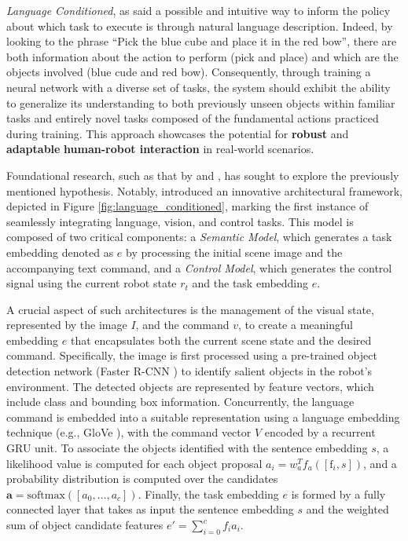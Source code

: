 \textit{Language Conditioned}, as said a possible and intuitive way to inform the policy about which task to execute is through natural language description. Indeed, by looking to the phrase ``Pick the blue cube and place it in the red bow'', there are both information about the action to perform (pick and place) and which are the objects involved (blue cude and red bow). Consequently, through training a neural network with a diverse set of tasks, the system should exhibit the ability to generalize its understanding to both previously unseen objects within familiar tasks and entirely novel tasks composed of the fundamental actions practiced during training. This approach showcases the potential for \textbf{robust} and \textbf{adaptable} \textbf{human-robot interaction} in real-world scenarios.

Foundational research, such as that by \cite{stepputtis2020language} and \cite{jang2022bc_z}, has sought to explore the previously mentioned hypothesis. Notably, \cite{stepputtis2020language} introduced an innovative architectural framework, depicted in Figure \ref{fig:language_conditioned}, marking the first instance of seamlessly integrating language, vision, and control tasks. This model is composed of two critical components: a \textit{Semantic Model}, which generates a task embedding denoted as $e$ by processing the initial scene image and the accompanying text command, and a \textit{Control Model}, which generates the control signal using the current robot state $r_{t}$ and the task embedding $e$.

A crucial aspect of such architectures is the management of the visual state, represented by the image $I$, and the command $v$, to create a meaningful embedding $e$ that encapsulates both the current scene state and the desired command. Specifically, the image is first processed using a pre-trained object detection network (Faster R-CNN \cite{fastrcnn}) to identify salient objects in the robot's environment. The detected objects are represented by feature vectors, which include class and bounding box information. Concurrently, the language command is embedded into a suitable representation using a language embedding technique (e.g., GloVe \cite{pennington2014glove}), with the command vector $V$ encoded by a recurrent GRU unit. To associate the objects identified with the sentence embedding $s$, a likelihood value is computed for each object proposal $a_{i} = w_{a}^{T} f_{a}([\text{f}_{i}, s])$, and a probability distribution is computed over the candidates $\mathbf{a} = \text{softmax}([a_0, \dots, a_c])$. Finally, the task embedding $e$ is formed by a fully connected layer that takes as input the sentence embedding $s$ and the weighted sum of object candidate features $e'= \sum_{i=0}^{c} f_{i}a_{i}$.

